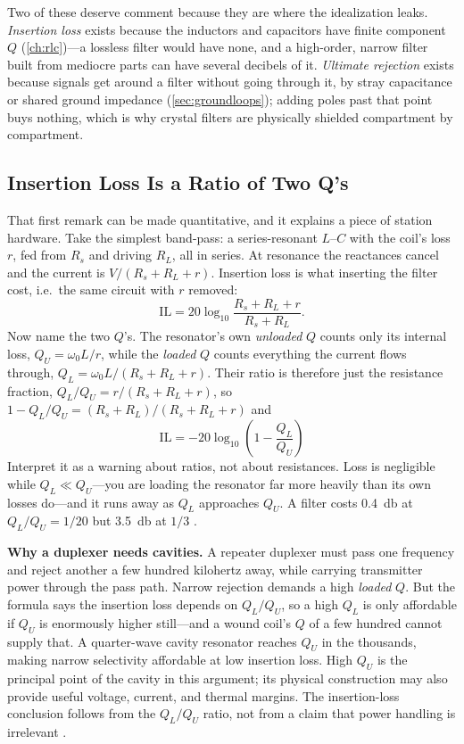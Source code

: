 Two of these deserve comment because they are where the idealization leaks.
\emph{Insertion loss} exists because the inductors and capacitors have finite
component \(Q\) (\cref{ch:rlc})---a lossless filter would have none, and a
high-order, narrow filter built from mediocre parts can have several decibels of it.
\emph{Ultimate rejection} exists because signals get around a filter without going
through it, by stray capacitance or shared ground impedance
(\cref{sec:groundloops}); adding poles past that point buys nothing, which is why
crystal filters are physically shielded compartment by compartment.

\subsection{Insertion Loss Is a Ratio of Two Q's}
\label{sec:qlqu}
That first remark can be made quantitative, and it explains a piece of station
hardware. Take the simplest band-pass: a series-resonant \(L\)--\(C\) with the coil's
loss \(r\), fed from \(R_s\) and driving \(R_L\), all in series. At resonance the
reactances cancel and the current is \(V/(R_s+R_L+r)\). Insertion loss is what
inserting the filter cost, i.e.\ the same circuit with \(r\) removed:
\[
\mathrm{IL}=20\log_{10}\frac{R_s+R_L+r}{R_s+R_L} .
\]
Now name the two \(Q\)'s. The resonator's own \emph{unloaded} \(Q\) counts only its
internal loss, \(Q_U=\omega_0L/r\), while the \emph{loaded} \(Q\) counts everything
the current flows through, \(Q_L=\omega_0L/(R_s+R_L+r)\). Their ratio is therefore
just the resistance fraction, \(Q_L/Q_U=r/(R_s+R_L+r)\), so
\(1-Q_L/Q_U=(R_s+R_L)/(R_s+R_L+r)\) and
\[
\boxed{\;\mathrm{IL}=-20\log_{10}\left(1-\frac{Q_L}{Q_U}\right)\;}
\]
Interpret it as a warning about ratios, not about resistances. Loss is negligible while
\(Q_L\ll Q_U\)---you are loading the resonator far more heavily than its own losses
do---and it runs away as \(Q_L\) approaches \(Q_U\). A filter costs
\SI{0.4}{\decibel} at \(Q_L/Q_U=1/20\) but \SI{3.5}{\decibel} at \(1/3\)
\cite[pp.~27--30]{bowick2008rfcircuit}.

\begin{physicalbox}
\textbf{Why a duplexer needs cavities.} A repeater duplexer must pass one frequency
and reject another a few hundred kilohertz away, while carrying transmitter power
through the pass path. Narrow rejection demands a high \emph{loaded} \(Q\). But the
formula says the insertion loss depends on \(Q_L/Q_U\), so a high \(Q_L\) is only
affordable if \(Q_U\) is enormously higher still---and a wound coil's \(Q\) of a few
hundred cannot supply that. A quarter-wave cavity resonator reaches \(Q_U\) in the
thousands, making narrow selectivity affordable at low insertion loss. High \(Q_U\)
is the principal point of the cavity in this argument; its physical construction may
also provide useful voltage, current, and thermal margins. The insertion-loss
conclusion follows from the \(Q_L/Q_U\) ratio, not from a claim that power handling is
irrelevant \cite[pp.~187--220]{weber2001microwave}.
\end{physicalbox}

